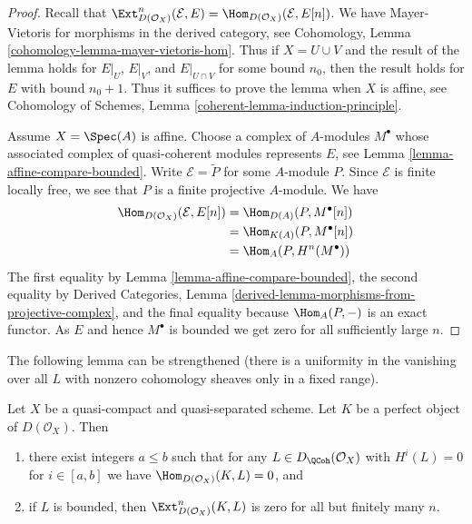 \begin{proof}
Recall that $\Ext^n_{D(\mathcal{O}_X)}(\mathcal{E}, E) =
\Hom_{D(\mathcal{O}_X)}(\mathcal{E}, E[n])$. We have
Mayer-Vietoris for morphisms in the derived category, see
Cohomology, Lemma \ref{cohomology-lemma-mayer-vietoris-hom}.
Thus if $X = U \cup V$ and the result of the lemma holds
for $E|_U$, $E|_V$, and $E|_{U \cap V}$ for some bound $n_0$,
then the result holds for $E$ with bound $n_0 + 1$.
Thus it suffices to prove the lemma when $X$ is affine, see
Cohomology of Schemes, Lemma \ref{coherent-lemma-induction-principle}.

\medskip\noindent
Assume $X = \Spec(A)$ is affine. Choose a complex of $A$-modules
$M^\bullet$ whose associated complex of quasi-coherent modules
represents $E$, see Lemma \ref{lemma-affine-compare-bounded}.
Write $\mathcal{E} = \widetilde{P}$ for some $A$-module $P$.
Since $\mathcal{E}$ is finite locally free, we see that $P$
is a finite projective $A$-module. We have
\begin{align*}
\Hom_{D(\mathcal{O}_X)}(\mathcal{E}, E[n])
& = 
\Hom_{D(A)}(P, M^\bullet[n]) \\
& =
\Hom_{K(A)}(P, M^\bullet[n]) \\
& =
\Hom_A(P, H^n(M^\bullet))
\end{align*}
The first equality by Lemma \ref{lemma-affine-compare-bounded},
the second equality by
Derived Categories, Lemma
\ref{derived-lemma-morphisms-from-projective-complex}, and
the final equality because $\Hom_A(P, -)$ is an exact functor.
As $E$ and hence $M^\bullet$ is bounded
we get zero for all sufficiently large $n$.
\end{proof}

\noindent
The following lemma can be strengthened (there is a uniformity
in the vanishing over all $L$ with nonzero cohomology sheaves
only in a fixed range).

\begin{lemma}
\label{lemma-ext-from-perfect-into-bounded-QCoh}
Let $X$ be a quasi-compact and quasi-separated scheme.
Let $K$ be a perfect object of $D(\mathcal{O}_X)$. Then
\begin{enumerate}
\item there exist integers $a \leq b$ such that for any
$L \in D_\QCoh(\mathcal{O}_X)$ with $H^i(L) = 0$ for $i \in [a, b]$
we have $\Hom_{D(\mathcal{O}_X)}(K, L) = 0$, and
\item if $L$ is bounded, then $\Ext^n_{D(\mathcal{O}_X)}(K, L)$
is zero for all but finitely many $n$.
\end{enumerate}
\end{lemma}


